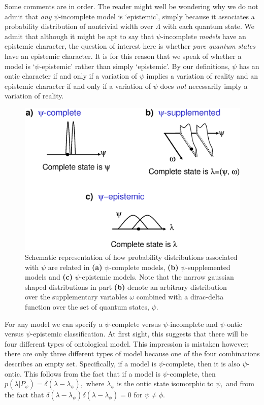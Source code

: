 \documentclass[aps,nofootinbib,12pt]{revtex4-2}
\begin{document}
Some comments are in order. The reader might well be wondering why
we do not admit that \emph{any} $\psi$-incomplete model is
`epistemic', simply because it associates a probability distribution
of nontrivial width over $\Lambda$ with each quantum state. We admit
that although it might be apt to say that $\psi$-incomplete
\textit{models} have an epistemic character, the question of
interest here is whether \emph{pure quantum states} have an
epistemic character. It is for this reason that we speak of whether
a model is `$\psi $-epistemic' rather than simply `epistemic'. By
our definitions, $\psi$ has an ontic character if and only if a
variation of $\psi$ implies a variation of reality and an epistemic
character if and only if a variation of $\psi$ does \emph{not}
necessarily imply a variation of reality.

\begin{figure}[t]
\includegraphics[scale=0.4]{classes2}\caption{Schematic representation of how
probability distributions associated with $\psi$ are related in
\textbf{(a)} $\psi$-complete models, \textbf{(b)}
$\psi$-supplemented models and \textbf{(c)} $\psi$-epistemic models.
Note that the narrow gaussian shaped distributions in part
\textbf{(b)} denote an arbitrary distribution over the supplementary
variables $\omega$ combined with a dirac-delta function over the set
of
quantum states, $\psi$.}%
\label{FIG:classes2}%
\end{figure}

For any model we can specify a $\psi$-complete versus
$\psi$-incomplete and $\psi$-ontic versus $\psi$-epistemic
classification. At first sight, this suggests that there will be
four different types of ontological model. This impression is
mistaken however; there are only three different types of model
because one of the four combinations describes an empty set.
Specifically, if a model is $\psi$-complete, then it is also
$\psi$-ontic. This follows from the fact that if a model is $\psi
$-complete, then $p\left(  \lambda|P_{\psi}\right) =\delta\left(
\lambda-\lambda_{\psi}\right),$ where $\lambda_{\psi}$ is the ontic
state isomorphic to $\psi,$ and from the fact that $\delta\left(
\lambda -\lambda_{\psi}\right) \delta\left(
\lambda-\lambda_{\phi}\right)  =0$ for $\psi\neq\phi$.\
\end{document}
